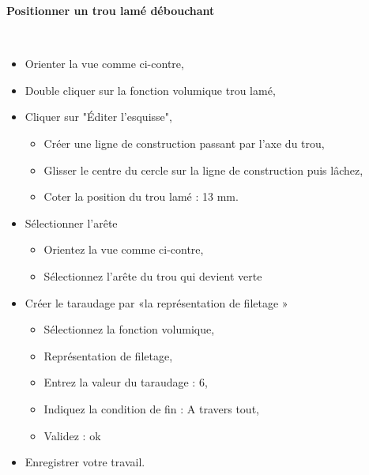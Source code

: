\textbf{Positionner un trou lamé débouchant}

~\

\begin{minipage}{0.75\linewidth}
\begin{itemize}
 \item Orienter la vue comme ci-contre,
 \item Double cliquer sur la fonction volumique trou lamé,
 \item Cliquer sur "Éditer l'esquisse",
  \begin{itemize}
  \item Créer une ligne de construction passant par l'axe du trou,
  \item Glisser le centre du cercle sur la ligne de construction puis lâchez,
  \item Coter la position du trou lamé : 13 mm.
 \end{itemize}
 \item Sélectionner l'arête
 \begin{itemize}
  \item Orientez la vue comme ci-contre,
  \item Sélectionnez l'arête du trou qui devient verte
 \end{itemize}
 \item Créer le taraudage par «la représentation de filetage »
 \begin{itemize}
  \item Sélectionnez la fonction volumique,
  \item Représentation de filetage,
  \item Entrez la valeur du taraudage : 6,
  \item Indiquez la condition de fin : A travers tout,
  \item Validez : ok
 \end{itemize}
 \item Enregistrer votre travail.
\end{itemize}
\end{minipage}
\hfill
